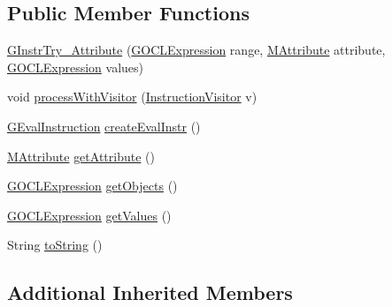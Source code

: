 \subsection*{Public Member Functions}
\begin{DoxyCompactItemize}
\item 
\hyperlink{classorg_1_1tzi_1_1use_1_1gen_1_1assl_1_1statics_1_1_g_instr_try___attribute_adac2fd25ab4b785afbf6b6dc9f2207ed}{G\-Instr\-Try\-\_\-\-Attribute} (\hyperlink{classorg_1_1tzi_1_1use_1_1gen_1_1assl_1_1statics_1_1_g_o_c_l_expression}{G\-O\-C\-L\-Expression} range, \hyperlink{classorg_1_1tzi_1_1use_1_1uml_1_1mm_1_1_m_attribute}{M\-Attribute} attribute, \hyperlink{classorg_1_1tzi_1_1use_1_1gen_1_1assl_1_1statics_1_1_g_o_c_l_expression}{G\-O\-C\-L\-Expression} values)
\item 
void \hyperlink{classorg_1_1tzi_1_1use_1_1gen_1_1assl_1_1statics_1_1_g_instr_try___attribute_a2d1686ef2ffbaedc293236f3ddbc6bee}{process\-With\-Visitor} (\hyperlink{interfaceorg_1_1tzi_1_1use_1_1gen_1_1assl_1_1statics_1_1_instruction_visitor}{Instruction\-Visitor} v)
\item 
\hyperlink{classorg_1_1tzi_1_1use_1_1gen_1_1assl_1_1dynamics_1_1_g_eval_instruction}{G\-Eval\-Instruction} \hyperlink{classorg_1_1tzi_1_1use_1_1gen_1_1assl_1_1statics_1_1_g_instr_try___attribute_a7e698ead74f00d0ce96c97ea98904caa}{create\-Eval\-Instr} ()
\item 
\hyperlink{classorg_1_1tzi_1_1use_1_1uml_1_1mm_1_1_m_attribute}{M\-Attribute} \hyperlink{classorg_1_1tzi_1_1use_1_1gen_1_1assl_1_1statics_1_1_g_instr_try___attribute_a8b0c7bd1c04a1723706f47f1a62806e0}{get\-Attribute} ()
\item 
\hyperlink{classorg_1_1tzi_1_1use_1_1gen_1_1assl_1_1statics_1_1_g_o_c_l_expression}{G\-O\-C\-L\-Expression} \hyperlink{classorg_1_1tzi_1_1use_1_1gen_1_1assl_1_1statics_1_1_g_instr_try___attribute_a4ba4d5700defa201918e4e7cd10e6900}{get\-Objects} ()
\item 
\hyperlink{classorg_1_1tzi_1_1use_1_1gen_1_1assl_1_1statics_1_1_g_o_c_l_expression}{G\-O\-C\-L\-Expression} \hyperlink{classorg_1_1tzi_1_1use_1_1gen_1_1assl_1_1statics_1_1_g_instr_try___attribute_a6f31ed1de8a51ee1bfde26754d68f7b7}{get\-Values} ()
\item 
String \hyperlink{classorg_1_1tzi_1_1use_1_1gen_1_1assl_1_1statics_1_1_g_instr_try___attribute_afa9f6414c78009c51580cf0043d6c8ad}{to\-String} ()
\end{DoxyCompactItemize}
\subsection*{Additional Inherited Members}



